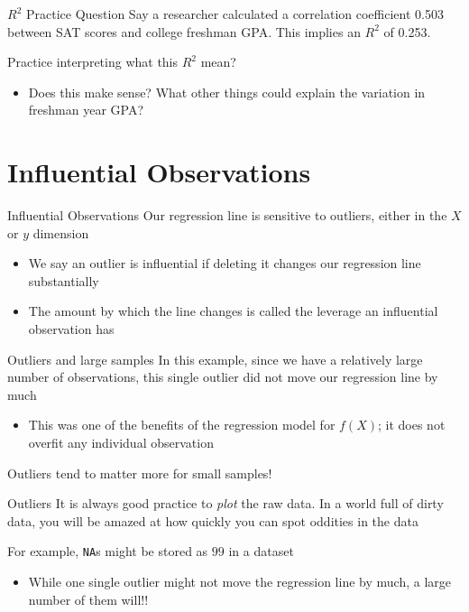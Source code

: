 \documentclass[aspectratio=169,t,11pt,table]{beamer}
\begin{document}
\begin{frame}{$R^2$ Practice Question}
  Say a researcher calculated a correlation coefficient 0.503 between SAT scores and college freshman GPA. This implies an $R^2$ of 0.253. 
  
  \bigskip
  Practice interpreting what this $R^2$ mean? 
  \begin{itemize}
    \item Does this make sense? What other things could explain the variation in freshman year GPA?
  \end{itemize}
\end{frame}

\section{Influential Observations}

\begin{frame}{Influential Observations}
  Our regression line is sensitive to \alert{outliers}, either in the $X$ or $y$ dimension 
  \begin{itemize}
    \item We say an outlier is \alert{influential} if deleting it changes our regression line substantially
    
    \item The amount by which the line changes is called the \alert{leverage} an influential observation has
  \end{itemize}
\end{frame}


\begin{frame}{Outliers and large samples}
  In this example, since we have a relatively large number of observations, this single outlier did not move our regression line by much
  \begin{itemize}
    \item This was one of the benefits of the regression model for $f(X)$; it does not overfit any individual observation
  \end{itemize}

  \bigskip
  Outliers tend to matter more for small samples!
\end{frame}

\begin{frame}{Outliers}
  It is always good practice to \emph{plot} the raw data. In a world full of dirty data, you will be amazed at how quickly you can spot oddities in the data

  \bigskip
  For example, \texttt{NA}s might be stored as $99$ in a dataset
  \begin{itemize}
    \item While one single outlier might not move the regression line by much, a large number of them will!!
  \end{itemize}
\end{frame}
\end{document}
